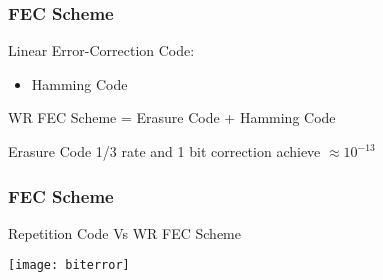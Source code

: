 \documentclass[]{beamer}
\begin{document}
\begin{frame}
\frametitle{FEC Scheme}
Linear Error-Correction Code:
\begin{itemize}
	\item Hamming Code
\end{itemize}

\vspace{0.5cm}
\begin{center}
WR FEC Scheme = Erasure Code + Hamming Code

Erasure Code  1/3 rate and 1 bit correction achieve $\approx 10^{-13}$   

\end{center}
\end{frame}




\begin{frame}
\frametitle{FEC Scheme}
Repetition Code Vs WR FEC Scheme
\begin{center}

  \texttt{[image: biterror]}



\end{center}
\end{frame}
\end{document}
